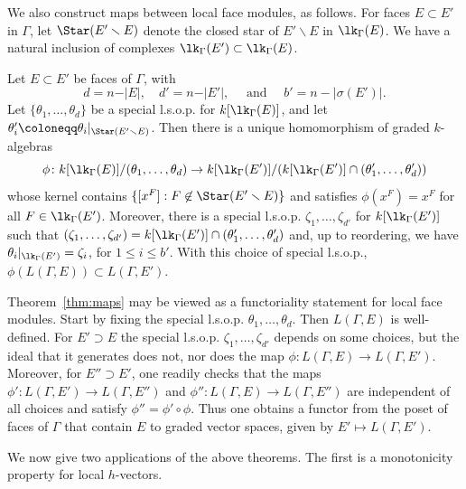 We also construct maps between local face modules, as follows. For faces $E \subset E'$ in $\Gamma$, let $\Star(E' \smallsetminus E)$ denote the closed star of $E' \smallsetminus E$ in $\lk_\Gamma(E)$. 
We have a natural inclusion of complexes 
$\lk_\Gamma(E') \subset \lk_\Gamma(E)$. 




\begin{theorem}\label{thm:maps}
Let $E \subset E'$ be faces of $\Gamma$, with $$d = n - \vert E \vert, \quad  
d' = n - \vert E' \vert, \quad 
\mbox{ and } \quad b' = n - |\sigma(E')|.$$ Let $\{\theta_1, \dotsc, \theta_{d } \}$ be a special l.s.o.p. for $k[\lk_{\Gamma}(E)]$,  
and let 
$\theta_i'  \coloneqq  \theta_i|_{\Star(E' \smallsetminus E)}$.  Then there is a 
unique homomorphism of graded 
$k$-algebras 
\[
\phi\colon k[\lk_{\Gamma}(E)]/(\theta_1, \dotsc, \theta_d) \to k[\lk_{\Gamma}(E')]/(k[\lk_\Gamma(E')]  \cap (\theta_1', \dotsc, \theta_{d}'))
\]
whose kernel contains $\{[x^F] : F \not \in \Star(E' \smallsetminus E)\}$ and satisfies $\phi(x^F) = x^F$ for all $F \in \lk_{\Gamma}(E')$. Moreover, there is a special l.s.o.p. $\zeta_1, \ldots, \zeta_{d'}$ for $k[\lk_\Gamma(E')]$ such that $(\zeta_1, \ldots, \zeta_{d'}) = k[\lk_\Gamma(E')] \cap (\theta'_1, \ldots, \theta'_{d})$ and, up to reordering, we have $\theta_i|_{\lk_\Gamma(E')} = \zeta_i$, for $1 \leq i \leq b'$.  With this choice of special l.s.o.p., $\phi(L(\Gamma,E)) \subset L(\Gamma,E')$. 
\end{theorem}

\begin{remark}
Theorem~\ref{thm:maps} may be viewed as a functoriality statement for local face modules. Start by fixing the special l.s.o.p. $\theta_1, \ldots, \theta_d$.  Then $L(\Gamma, E)$ is well-defined. For $E' \supset E$ the special l.s.o.p. $\zeta_1, \ldots, \zeta_{d'}$ depends on some choices, but the ideal that it generates does not, nor does the map $\phi \colon L(\Gamma,E) \to L(\Gamma,E')$.  Moreover, for $E'' \supset E'$, one readily checks that the maps $\phi' \colon L(\Gamma, E') \to L(\Gamma, E'')$ and $\phi '' \colon L(\Gamma,E) \to L(\Gamma, E'')$ are independent of all choices and satisfy $\phi'' = \phi' \circ \phi$.  Thus one obtains a functor from the poset of faces of $\Gamma$ that contain $E$ to graded vector spaces, given by $E' \mapsto L(\Gamma, E')$.
\end{remark}

We now give two applications of the above theorems. The first is a monotonicity property for local $h$-vectors.

